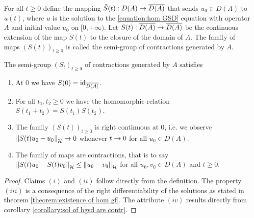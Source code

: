\begin{definition}\label{definition:semi group of contractions}
	For all $ t\geq 0 $ define the mapping
	$ \tilde S(t):D(A) \rightarrow \overline{D(A)} $ that sends
	$ u_0\in D(A) $ to $ u(t) $, where $ u $ is the solution to the 
	\ref{equation:hom GSD} equation with operator $ A $
	and initial value $ u_0 $ on $ [0,\plus\infty) $.
	Let $ S(t):\overline{D(A)} \rightarrow \overline{D(A)} $
	be the continuous extension of the map $ \tilde S(t) $ 
	to the closure of the domain
	of $ A $. The family of maps $ (S(t))_{t\geq 0} $ is called 
	the semi-group of contractions generated by $ A $.
\end{definition}

\begin{corollary}\label{lemma:prop of semi grp contr}
	The semi-group $ (S_t)_{t\geq 0} $ of contractions generated by $ A $ satisfies
	\begin{enumerate}[label=(\roman*)]
		\item At $ 0 $ we have $ S(0)=\operatorname{\mathrm{id}}_{\overline{D(A)}} $.
		\item For all $ t_1, t_2\geq 0 $ we have
		the homomorphic relation
		$ S(t_1+t_2)=S(t_1)S(t_2) $.
		\item The family $ (S(t))_{t\geq 0} $ is right continuous at $ 0 $,
		i.e. we observe $ \left\Vert S(t)u_0 - u_0\right\Vert_{\mathcal{H}} \rightarrow 0 $ whenever $ t \rightarrow 0 $ 
		for all $ u_0\in \overline{D(A)} $.
		\item The family of maps are contractions, that is to say 
		$ \left\Vert S(t)u_0 - S(t)v_0\right\Vert_{\mathcal{H}}\leq \left\Vert u_0 - v_0\right\Vert_{\mathcal{H}} $ for
		all $ u_0,v_0\in\overline{D(A)}$ and $ t\geq 0 $.
	\end{enumerate}
\end{corollary}
\begin{proof}
	Claims $ (i) $ and $ (ii) $ follow directly from the definition.
	The property $ (iii) $ is a consequence of the
	right differentiability of the solutions as stated in
	theorem \ref{theorem:existence of hom gf}. The attribute 
	$ (iv) $ results directly from 
	corollary \ref{corollary:sol of hgsd are contr}.
\end{proof}

